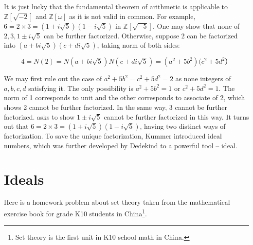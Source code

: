 \documentclass[b5paper]{article}
\begin{document}
It is just lucky that the fundamental theorem of arithmetic is applicable to $\mathbb{Z}[\sqrt{-2}]$ and $\mathbb{Z}[\omega]$ as it is not valid in common. For example, $6 = 2 \times 3 = (1 + i\sqrt{5})(1 - i\sqrt{5})$ in $\mathbb{Z}[\sqrt{-5}]$. One may show that none of $2, 3, 1 \pm i\sqrt{5}$ can be further factorized. Otherwise, suppose 2 can be factorized into $(a + bi\sqrt{5})(c + di\sqrt{5})$, taking norm of both sides:

\[
4 = N(2) = N(a + bi\sqrt{5})N(c + di\sqrt{5}) = (a^2 + 5b^2)(c^2 + 5d^2）
\]

We may first rule out the case of $a^2 + 5b^2 = c^2 + 5d^2 = 2$ as none integers of $a, b, c, d$ satisfying it. The only possibility is $a^2 + 5b^2 = 1$ or $c^2 + 5d^2 = 1$. The norm of 1 corresponds to unit and the other corresponds to associate of 2, which shows 2 cannot be further factorized. In the same way, 3 cannot be further factorized.  asks to show $1 \pm i\sqrt{5}$ cannot be further factorized in this way. It turns out that $6 = 2 \times 3 = (1 + i\sqrt{5})(1 - i\sqrt{5})$, having two distinct ways of factorization. To save the unique factorization, Kummer introduced ideal numbers, which was further developed by Dedekind to a powerful tool -- ideal.

\section{Ideals}
Here is a homework problem about set theory taken from the mathematical exercise book for grade K10 students in China\footnote{Set theory is the first unit in K10 school math in China.}.
\end{document}
